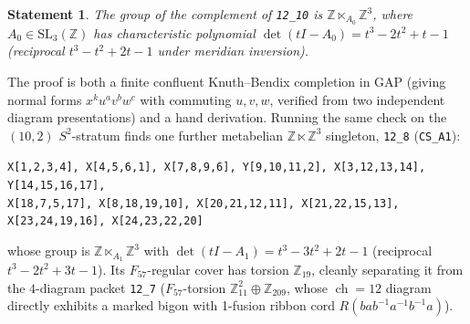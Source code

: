 \documentclass[11pt]{amsart}
\newcommand{\ch}{\operatorname{ch}}
\newcommand{\Z}{\mathbb{Z}}
\newcommand{\lab}[1]{\texttt{#1}}
\newcommand{\inv}{^{-1}}
\theoremstyle{plain}
\newtheorem{fact}{Statement}
\theoremstyle{remark}
\begin{document}
\begin{fact}\label{st:cs}
The group of the complement of \lab{12\_10} is $\Z\ltimes_{A_0}\Z^3$, where $A_0\in\mathrm{SL}_3(\Z)$ has
characteristic polynomial $\det(tI-A_0)=t^3-2t^2+t-1$ (reciprocal $t^3-t^2+2t-1$ under meridian inversion).
\end{fact}

The proof is both a finite confluent Knuth--Bendix completion in GAP (giving normal forms $x^k u^a v^b w^c$
with commuting $u,v,w$, verified from two independent diagram presentations) and a hand derivation.
Running the same check on the $(10,2)$ $S^2$-stratum finds one further metabelian $\Z\ltimes\Z^3$
singleton, \lab{12\_8} (\lab{CS\_A1}):
\begin{center}\scriptsize
\texttt{X[1,2,3,4], X[4,5,6,1], X[7,8,9,6], Y[9,10,11,2], X[3,12,13,14], Y[14,15,16,17],}\\
\texttt{X[18,7,5,17], X[8,18,19,10], X[20,21,12,11], X[21,22,15,13], X[23,24,19,16], X[24,23,22,20]}
\end{center}
whose group is $\Z\ltimes_{A_1}\Z^3$ with $\det(tI-A_1)=t^3-3t^2+2t-1$ (reciprocal $t^3-2t^2+3t-1$). Its
$F_{57}$-regular cover has torsion $\Z_{19}$, cleanly separating it from the $4$-diagram packet \lab{12\_7}
($F_{57}$-torsion $\Z_{11}^2\oplus\Z_{209}$, whose $\ch=12$ diagram directly exhibits a marked bigon with
1-fusion ribbon cord $R(bab\inv a\inv b\inv a)$).
\end{document}
